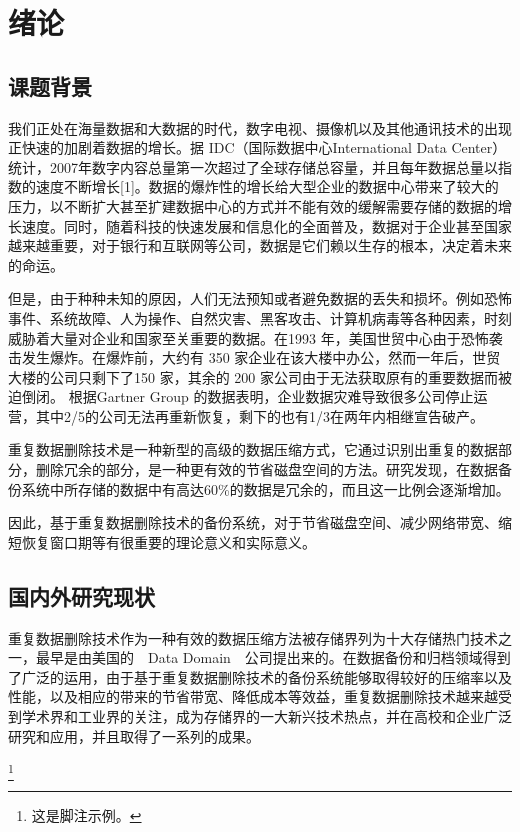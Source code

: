 \chapter{绪论}\thispagestyle{main}

\section{课题背景}

\par 我们正处在海量数据和大数据的时代，数字电视、摄像机以及其他通讯技术的出现正快速的加剧着数据的增长。据 IDC（国际数据中心International Data Center）统计，2007年数字内容总量第一次超过了全球存储总容量，并且每年数据总量以指数的速度不断增长[1]。数据的爆炸性的增长给大型企业的数据中心带来了较大的压力，以不断扩大甚至扩建数据中心的方式并不能有效的缓解需要存储的数据的增长速度。同时，随着科技的快速发展和信息化的全面普及，数据对于企业甚至国家越来越重要，对于银行和互联网等公司，数据是它们赖以生存的根本，决定着未来的命运。

\par 但是，由于种种未知的原因，人们无法预知或者避免数据的丢失和损坏。例如恐怖事件、系统故障、人为操作、自然灾害、黑客攻击、计算机病毒等各种因素，时刻威胁着大量对企业和国家至关重要的数据。在1993 年，美国世贸中心由于恐怖袭击发生爆炸。在爆炸前，大约有 350 家企业在该大楼中办公，然而一年后，世贸大楼的公司只剩下了150 家，其余的 200 家公司由于无法获取原有的重要数据而被迫倒闭。 根据Gartner Group 的数据表明，企业数据灾难导致很多公司停止运营，其中2/5的公司无法再重新恢复，剩下的也有1/3在两年内相继宣告破产。

\par 重复数据删除技术是一种新型的高级的数据压缩方式，它通过识别出重复的数据部分，删除冗余的部分，是一种更有效的节省磁盘空间的方法。研究发现，在数据备份系统中所存储的数据中有高达60\%的数据是冗余的，而且这一比例会逐渐增加。

\par 因此，基于重复数据删除技术的备份系统，对于节省磁盘空间、减少网络带宽、缩短恢复窗口期等有很重要的理论意义和实际意义。

\section{国内外研究现状}

\par 重复数据删除技术作为一种有效的数据压缩方法被存储界列为十大存储热门技术之一，最早是由美国的\ \ Data Domain\ \ 公司提出来的。在数据备份和归档领域得到了广泛的运用，由于基于重复数据删除技术的备份系统能够取得较好的压缩率以及性能，以及相应的带来的节省带宽、降低成本等效益，重复数据删除技术越来越受到学术界和工业界的关注，成为存储界的一大新兴技术热点，并在高校和企业广泛研究和应用，并且取得了一系列的成果。

\footnote{这是脚注示例。}
